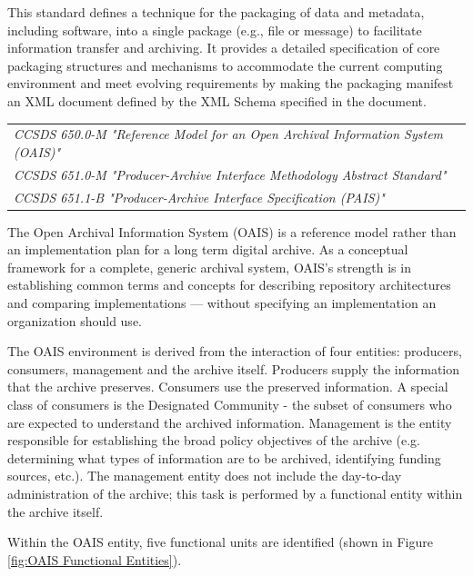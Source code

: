 This standard defines a technique for the packaging of data and metadata, including software, into a single package (e.g., file or message) to facilitate information transfer and archiving. It provides a detailed specification of core packaging structures and mechanisms to accommodate the current computing environment and meet evolving requirements by making the packaging manifest an XML document defined by the XML Schema specified in the document.

\begin{tabular}{l}
\textit{CCSDS 650.0-M "Reference Model for an Open Archival Information System (OAIS)" \cite{CCSDS 650.0-M}} \\
\textit{CCSDS 651.0-M "Producer-Archive Interface Methodology Abstract Standard" \cite{CCSDS 651.0-M}} \\
\textit{CCSDS 651.1-B "Producer-Archive Interface Specification (PAIS)" \cite{CCSDS 651.1-B}} \\
\end{tabular}

The Open Archival Information System (OAIS) is a reference model rather than an implementation plan for a long term digital archive. As a conceptual framework for a complete, generic archival system, OAIS's strength is in establishing common terms and concepts for describing repository architectures and comparing implementations — without specifying an implementation an organization should use. 

The OAIS environment is derived from the interaction of four entities: producers, consumers, management and the archive itself. Producers supply the information that the archive preserves. Consumers use the preserved information. A special class of consumers is the Designated Community - the subset of consumers who are expected to understand the archived information. Management is the entity responsible for establishing the broad policy objectives of the archive (e.g. determining what types of information are to be archived, identifying funding sources, etc.). The management entity does not include the day-to-day administration of the archive; this task is performed by a functional entity within the archive itself.

Within the OAIS entity, five functional units are identified (shown in Figure \ref{fig:OAIS Functional Entities}).

